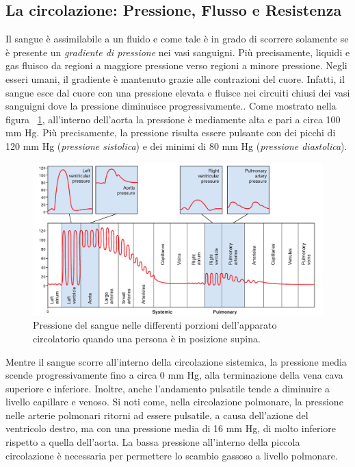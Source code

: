 \subsection{La circolazione: Pressione, Flusso e Resistenza}
Il sangue è assimilabile a un fluido e come tale è in grado di scorrere solamente se è presente un \textit{gradiente di pressione} nei vasi sanguigni. Più precisamente, liquidi e gas fluisco da regioni a maggiore pressione verso regioni a minore pressione. Negli esseri umani, il gradiente è mantenuto grazie alle contrazioni del cuore. Infatti, il sangue esce dal cuore con una pressione elevata e fluisce nei circuiti chiusi dei vasi sanguigni dove la pressione diminuisce progressivamente.\cite{SilverthornDeeUnglaub2020Fu:u}.
Come mostrato nella figura \Fig~\ref{fig:PressioneSangue}, all'interno dell'aorta la pressione è mediamente alta e pari a circa 100 mm Hg. Più precisamente, la pressione risulta essere pulsante con dei picchi di 120 mm Hg (\textit{pressione sistolica}) e dei minimi di 80 mm Hg (\textit{pressione diastolica}).
\begin{figure}[b!]
 	\centering
 	\includegraphics[width=0.9\linewidth]{ImageFiles/Fotopletismografia/PressioneSangue}
 	\caption{Pressione del sangue nelle differenti porzioni dell'apparato circolatorio quando una persona è in posizione supina.}
 	\label{fig:PressioneSangue}
\end{figure}
Mentre il sangue scorre all'interno della circolazione sistemica, la pressione media scende progressivamente fino a circa 0 mm Hg, alla terminazione della vena cava superiore e inferiore. Inoltre, anche l'andamento pulsatile tende a diminuire a livello capillare e venoso. Si noti come, nella circolazione polmonare, la pressione nelle arterie polmonari ritorni ad essere pulsatile, a causa dell'azione del ventricolo destro, ma con una pressione media di 16 mm Hg, di molto inferiore rispetto a quella dell'aorta. La bassa pressione all'interno della piccola circolazione è necessaria per permettere lo scambio gassoso a livello polmonare.

